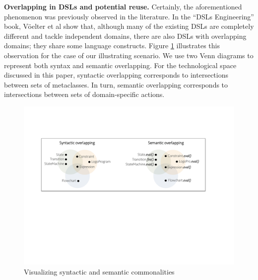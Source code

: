 
\textbf{Overlapping in DSLs and potential reuse.} Certainly, the aforementioned phenomenon was previously observed in the literature. In the ``DSLs Engineering'' book, V\"oelter et al \cite[p. 60-61]{voelter:2013} show that, although many of the existing DSLs are completely different and tackle independent domains, there are also DSLs with overlapping domains; they share some language constructs. Figure \ref{fig:shape} illustrates this observation for the case of our illustrating scenario. We use two Venn diagrams to represent both syntax and semantic overlapping. For the technological space discussed in this paper, syntactic overlapping corresponds to intersections between sets of metaclasses. In turn, semantic overlapping corresponds to intersections between sets of domain-specific actions. 

\begin{figure}
\centering
\includegraphics[width=1\linewidth]{images/domains-inaction.pdf}
\caption{Visualizing syntactic and semantic commonalities}
\label{fig:shape}
\end{figure}


